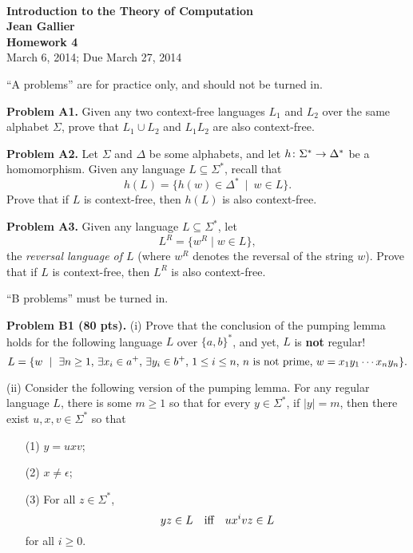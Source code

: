 \documentclass[12pt]{article}
\begin{document}
\begin{center}
\\
\vspace{1cm}
{\Large\bf Introduction to the Theory of Computation\\
Jean Gallier \\
\vspace{0.5cm}
Homework 4}\\[10pt]
March 6, 2014; Due March 27, 2014\\
\end{center}

\vspace {0.25cm}
``A problems'' are for practice only, and should not
be turned in.

\vspace {0.25cm}
\noindent
{\bf Problem A1.} 
Given any two context-free languages
$L_1$ and $L_2$ over the same alphabet $\Sigma$, prove that
$L_1\cup L_2$ and $L_1L_2$ are also context-free.

\vspace {0.25cm}
\noindent
{\bf Problem A2.} 
Let $\Sigma$ and $\Delta$ be some alphabets, and
let $h\colon \Sigma^*\rightarrow \Delta^*$ be a homomorphism.
Given any language $L\subseteq \Sigma^*$,
recall that
\[h(L) = \{h(w)\in \Delta^* \ \mid \ w\in L\}.\]
Prove that if $L$ is context-free, then $h(L)$ is also
context-free.

\vspace {0.25cm}
\noindent
{\bf Problem A3.} 
Given any language $L\subseteq \Sigma^*$, let
\[L^R = \{w^R \mid w \in L\},\]
the {\it reversal language of $L$\/} (where $w^R$
denotes the reversal of the string $w$).
Prove that if $L$ is context-free, then $L^R$
is also context-free.


\vspace {0.5cm}
``B problems'' must be turned in.

\vspace{0.25cm}\noindent
{\bf Problem B1 (80 pts).} 
(i) Prove that the conclusion of the pumping lemma holds for the following
language $L$ over $\{a, b\}^*$,
and yet, $L$ is {\bf not\/} regular!
\[L = \{w \ \mid \ \exists n \geq 1,\,
\exists x_i\in a^+,\,\exists y_i\in b^+,\, 1\leq i \leq n,\,
\hbox{$n$ is not prime},\,
w = x_1y_1 \cdots x_ny_n\}.\]

\medskip
(ii)
Consider the following version of the pumping lemma.
For any regular language $L$, there is some $m \geq 1$ so that
for every $y\in \Sigma^*$, if $|y| = m$, then there exist
$u, x, v\in \Sigma^*$ so that
\begin{enumerate}
\item[(1)]
$y = uxv$;
\item[(2)]
$x\not= \epsilon$;
\item[(3)]
For all $z\in \Sigma^*$,
\[yz \in L
\quad\hbox{iff}\quad
ux^ivz\in L\]
for all $i\geq 0$.
\end{enumerate}
\end{document}
